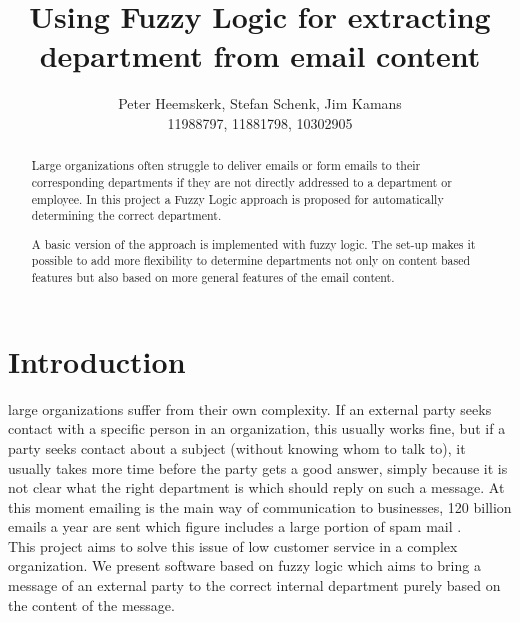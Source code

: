 \documentclass[journal]{IEEEtran}
\begin{document}
\title{Using Fuzzy Logic for extracting department from email content}
\author{Peter Heemskerk, Stefan Schenk, Jim Kamans\\11988797, 11881798, 10302905}


\maketitle

\begin{abstract}
Large organizations often struggle to deliver emails or form emails to their corresponding departments if they are not directly addressed to a department or employee. In this project a Fuzzy Logic approach is proposed for automatically determining the correct department. 

A basic version of the approach is implemented with fuzzy logic. The set-up makes it possible to add more flexibility to determine departments not only on content based features but also based on more general features of the email content. 

\end{abstract}

\section{Introduction}
 large organizations suffer from their own complexity. If an external party seeks contact with a specific person in an organization, this usually works fine, but if a party seeks contact about a subject (without knowing whom to talk to), it usually takes more time before the party gets a good answer, simply because it is not clear what the right department is which should reply on such a message. At this moment emailing is the main way of communication to businesses, 120 billion emails a year are sent which figure includes a large portion of spam mail \cite{email_statistics}.\\


This project aims to solve this issue of low customer service in a complex organization. We present software based on fuzzy logic which aims to bring a message of an external party to the correct internal department purely based on the content of the message.
\end{document}
